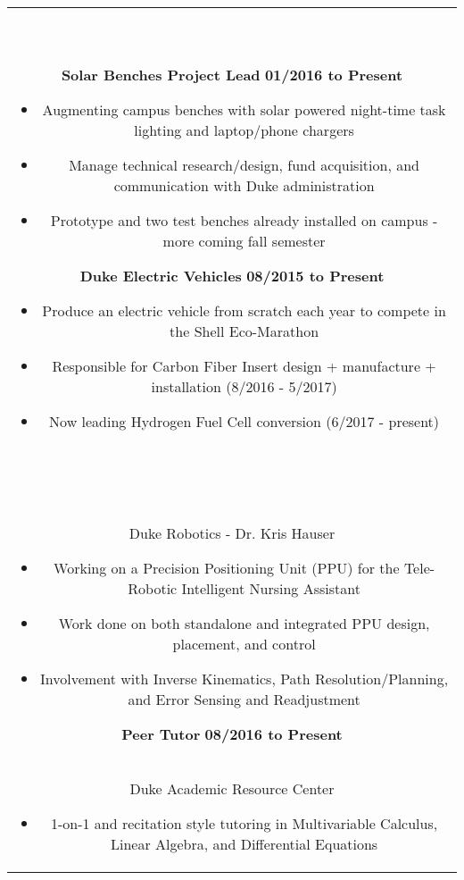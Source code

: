 \documentclass[11pt]{amsart}
\newcommand*\ruleline[1]{\par\noindent\raisebox{.8ex}{\makebox[\linewidth]{\hrulefill\hspace{1ex}\raisebox{-.8ex}{\Large~#1~}\hspace{1ex}\hrulefill}}\\ \-\ \vspace{-1em}}
\begin{document}
\begin{center}
\begin{tabular}{c}
	\ruleline{Activities}
	\begin{minipage}{\textwidth}
		{\bf Solar Benches Project Lead} \hfill {\bf 01/2016 to Present}
		\begin{itemize}
			\item Augmenting campus benches with solar powered night-time task lighting and laptop/phone chargers
			\item Manage technical research/design, fund acquisition, and communication with Duke administration
			\item Prototype and two test benches already installed on campus - more coming fall semester
		\end{itemize}
		{\bf Duke Electric Vehicles} \hfill {\bf 08/2015 to Present}
		\begin{itemize}
			\item Produce an electric vehicle from scratch each year to compete in the Shell Eco-Marathon
			\item Responsible for Carbon Fiber Insert design + manufacture + installation (8/2016 - 5/2017)
			\item Now leading Hydrogen Fuel Cell conversion (6/2017 - present)
		\end{itemize}
	\end{minipage}\\~\\
	
	\ruleline{Work History}
	\begin{minipage}{\textwidth}
		{\bf Robotics NSF REU Internship} \hfill {\bf 05/2017 to Present}\\
		{Duke Robotics - Dr. Kris Hauser}
		\begin{itemize}
			\item Working on a Precision Positioning Unit (PPU) for the Tele-Robotic Intelligent Nursing Assistant
			\item Work done on both standalone and integrated PPU design, placement, and control
			\item Involvement with Inverse Kinematics, Path Resolution/Planning, and Error Sensing and Readjustment
		\end{itemize}
		
		{\bf Peer Tutor} \hfill {\bf 08/2016 to Present}\\
		{Duke Academic Resource Center}
		\begin{itemize}
			\item 1-on-1 and recitation style tutoring in Multivariable Calculus, Linear Algebra, and Differential Equations
		\end{itemize}
		

\end{minipage}
\end{tabular}
\end{center}
\end{document}
